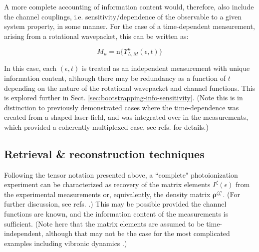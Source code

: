 \documentclass[10pt]{article}
\begin{document}
A more complete accounting of information content would, therefore,
also include the channel couplings, i.e. sensitivity/dependence of the observable to a given system property, in some manner. For the case of a time-dependent measurement, arising from a rotational wavepacket, this can be written as:

\begin{equation}
M_{u}=\mathrm{n}\{\varUpsilon_{L,M}^{u}(\epsilon,t)\}
\end{equation}

In this case, each $(\epsilon,t)$ is treated as an independent measurement with unique information content, although there may be redundancy as a function of $t$ depending on the nature of the rotational wavepacket and channel functions. This is explored further in Sect. \ref{sec:bootstrapping-info-sensitivity}. (Note this is in distinction to previously demonstrated cases where the time-dependence was created from a shaped laser-field, and was integrated over in the measurements, which provided a coherently-multiplexed case, see refs. \cite{hockett2014CompletePhotoionizationExperiments, hockett2015CompletePhotoionizationExperiments,hockett2015CoherentControlPhotoelectron} for details.)









\subsection{Retrieval \& reconstruction techniques\label{sec:recon-techniques-intro}}


Following the tensor notation presented above, a ``complete" photoionization experiment can be characterized as recovery of the matrix elements $I^{\zeta}(\epsilon)$ from the experimental measurements or, equivalently, the density matrix $\mathbf{\rho}^{\zeta\zeta'}$. (For further discussion, see refs. \cite{Reid2003,kleinpoppen2013perfect,hockett2018QMP1}.) This may be possible provided the channel functions are known, and the information content of the measurements is sufficient. (Note here that the matrix elements are assumed to be time-independent, although that may not be the case for the most complicated examples including vibronic dynamics \cite{hockett2018QMP2}.) 
\end{document}
